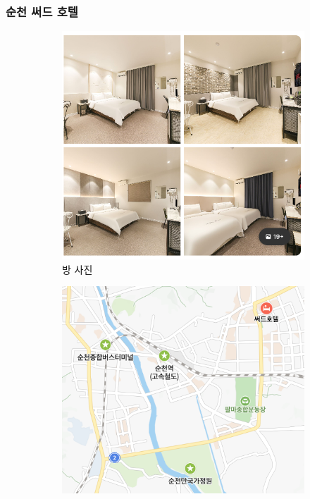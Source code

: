 \documentclass[10pt]{article}
\begin{document}
\subsubsection{순천 써드 호텔}
\begin{figure}[htbp]
  \centering
  \begin{subfigure}{0.3\textwidth}
    \centering
    \includegraphics[width=\linewidth]{fig/6_방.png}
    \caption{방 사진}
    \label{fig:1}
  \end{subfigure}
  \hfill
  \begin{subfigure}{0.3\textwidth}
    \centering
    \includegraphics[width=\linewidth]{fig/6_위치.png}

\end{subfigure}
\end{figure}
\end{document}
